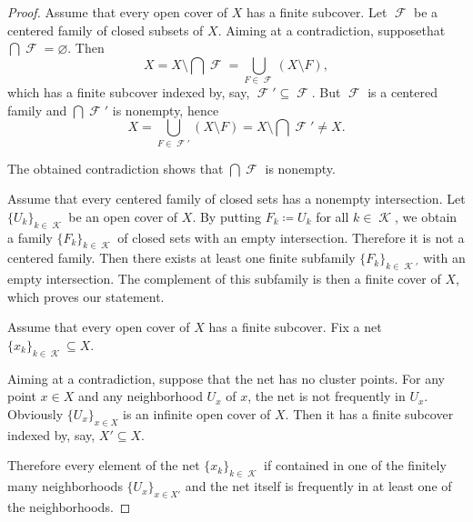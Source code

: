 \begin{proof}
   Assume that every open cover of \( X \) has a finite subcover. Let \( \mscrF \) be a centered family of closed subsets of \( X \). Aiming at a contradiction, suppose\LEM that \( \bigcap \mscrF = \varnothing \). Then
  \begin{equation*}
    X
    =
    X \setminus \bigcap \mscrF
    =
    \bigcup_{F \in \mscrF} (X \setminus F),
  \end{equation*}
  which has a finite subcover indexed by, say, \( \mscrF' \subseteq \mscrF \). But \( \mscrF \) is a centered family and \( \bigcap \mscrF' \) is nonempty, hence
  \begin{equation*}
    X
    =
    \bigcup_{F \in \mscrF'} (X \setminus F)
    =
    X \setminus \bigcap \mscrF'
    \neq
    X.
  \end{equation*}

  The obtained contradiction shows that \( \bigcap \mscrF \) is nonempty.

   Assume that every centered family of closed sets has a nonempty intersection. Let \( \{ U_k \}_{k \in \mscrK} \) be an open cover of \( X \). By putting \( F_k \coloneqq U_k \) for all \( k \in \mscrK \), we obtain a family \( \{ F_k \}_{k \in \mscrK} \) of closed sets with an empty intersection. Therefore it is not a centered family. Then there exists at least one finite subfamily \( \{ F_k \}_{k \in \mscrK'} \) with an empty intersection. The complement of this subfamily is then a finite cover of \( X \), which proves our statement.

   Assume that every open cover of \( X \) has a finite subcover. Fix a net \( \{ x_k \}_{k \in \mscrK} \subseteq X \).

  Aiming at a contradiction, suppose that the net has no cluster points. For any point \( x \in X \) and any neighborhood \( U_x \) of \( x \), the net is not frequently in \( U_x \). Obviously \( \{ U_x \}_{x \in X} \) is an infinite open cover of \( X \). Then it has a finite subcover indexed by, say, \( X' \subseteq X \).

  Therefore every element of the net \( \{ x_k \}_{k \in \mscrK} \) if contained in one of the finitely many neighborhoods \( \{ U_x \}_{x \in X'} \) and the net itself is frequently in at least one of the neighborhoods.


\end{proof}
